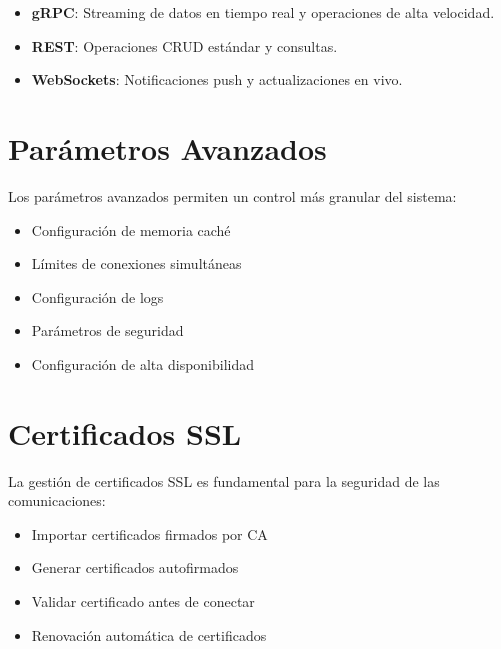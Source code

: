 \begin{itemize}
\item \textbf{gRPC}: Streaming de datos en tiempo real y operaciones de alta velocidad.
\item \textbf{REST}: Operaciones CRUD estándar y consultas.
\item \textbf{WebSockets}: Notificaciones push y actualizaciones en vivo.
\end{itemize}

\section{Parámetros Avanzados}

Los parámetros avanzados permiten un control más granular del sistema:

\begin{itemize}
    \item Configuración de memoria caché
    \item Límites de conexiones simultáneas
    \item Configuración de logs
    \item Parámetros de seguridad
    \item Configuración de alta disponibilidad
\end{itemize}

\section{Certificados SSL}

La gestión de certificados SSL es fundamental para la seguridad de las comunicaciones:

\begin{itemize}
    \item Importar certificados firmados por CA
    \item Generar certificados autofirmados
    \item Validar certificado antes de conectar
    \item Renovación automática de certificados
\end{itemize}

\clearpage
